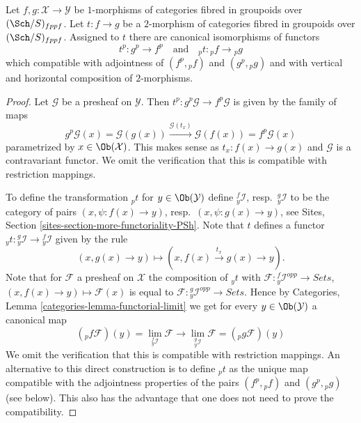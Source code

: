 \begin{lemma}
\label{lemma-2-morphisms-presheaves}
Let $f, g : \mathcal{X} \to \mathcal{Y}$ be $1$-morphisms of categories
fibred in groupoids over $(\Sch/S)_{fppf}$. Let $t : f \to g$
be a $2$-morphism of categories fibred in groupoids over
$(\Sch/S)_{fppf}$. Assigned to $t$ there are canonical
isomorphisms of functors
$$
t^p : g^p \longrightarrow f^p
\quad\text{and}\quad
{}_pt : {}_pf \longrightarrow {}_pg
$$
which compatible with adjointness of $(f^p, {}_pf)$ and
$(g^p, {}_pg)$ and with
vertical and horizontal composition of $2$-morphisms.
\end{lemma}

\begin{proof}
Let $\mathcal{G}$ be a presheaf on $\mathcal{Y}$. Then
$t^p : g^p\mathcal{G} \to f^p\mathcal{G}$ is given by the family
of maps
$$
g^p\mathcal{G}(x) = \mathcal{G}(g(x))
\xrightarrow{\mathcal{G}(t_x)}
\mathcal{G}(f(x)) = f^p\mathcal{G}(x)
$$
parametrized by $x \in \Ob(\mathcal{X})$. This makes sense as
$t_x : f(x) \to g(x)$ and $\mathcal{G}$ is a contravariant functor.
We omit the verification that this is compatible with restriction
mappings.

\medskip\noindent
To define the transformation ${}_pt$ for $y \in \Ob(\mathcal{Y})$
define ${}_y^f\mathcal{I}$, resp.\ ${}_y^g\mathcal{I}$ to be the category
of pairs $(x, \psi : f(x) \to y)$, resp.\ $(x, \psi : g(x) \to y)$, see
Sites, Section \ref{sites-section-more-functoriality-PSh}.
Note that $t$ defines a functor
${}_yt : {}_y^g\mathcal{I} \to {}_y^f\mathcal{I}$
given by the rule
$$
(x, g(x) \to y) \longmapsto (x, f(x) \xrightarrow{t_x} g(x) \to y).
$$
Note that for $\mathcal{F}$ a presheaf on $\mathcal{X}$ the composition
of ${}_yt$ with $\mathcal{F} : {}_y^f\mathcal{I}^{opp} \to \textit{Sets}$,
$(x, f(x) \to y) \mapsto \mathcal{F}(x)$ is equal to
$\mathcal{F} : {}_y^g\mathcal{I}^{opp} \to \textit{Sets}$. Hence by
Categories, Lemma \ref{categories-lemma-functorial-limit}
we get for every $y \in \Ob(\mathcal{Y})$ a canonical map
$$
({}_pf\mathcal{F})(y) = \lim_{{}_y^f\mathcal{I}} \mathcal{F}
\longrightarrow
\lim_{{}_y^g\mathcal{I}} \mathcal{F} = ({}_pg\mathcal{F})(y)
$$
We omit the verification that this is compatible with restriction
mappings. An alternative to this direct construction is to define
${}_pt$ as the unique map compatible with the adjointness properties
of the pairs $(f^p, {}_pf)$ and $(g^p, {}_pg)$ (see below). This also
has the advantage that one does not need to prove the compatibility.


\end{proof}
